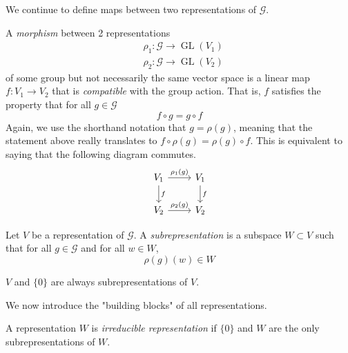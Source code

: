 \documentclass{article}
\DeclareMathOperator{\GL}{GL}
\begin{document}
  We continue to define maps between two representations of $\mathcal{G}$. 

  \begin{definition}
  A \textit{morphism} between 2 representations 
  \begin{align*}
      & \rho_1: \mathcal{G} \longrightarrow \GL(V_1) \\
      & \rho_2: \mathcal{G} \longrightarrow \GL(V_2) 
  \end{align*}
  of some group but not necessarily the same vector space is a linear map $f: V_1 \longrightarrow V_2$ that is \textit{compatible} with the group action. That is, $f$ satisfies the property that for all $g \in \mathcal{G}$
  \[f \circ g = g \circ f\]
  Again, we use the shorthand notation that $g = \rho(g)$, meaning that the statement above really translates to $ f \circ \rho(g) = \rho(g) \circ f$. This is equivalent to saying that the following diagram commutes. 
  \[\begin{tikzcd}
  V_1 \arrow{r}{\rho_1(g)} \arrow{d}{f} & V_1 \arrow{d}{f} \\
  V_2 \arrow{r}{\rho_2 (g)} & V_2
  \end{tikzcd}\]
  \end{definition}

  \begin{definition}
  Let $V$ be a representation of $\mathcal{G}$. A \textit{subrepresentation} is a subspace $W \subset V$ such that for all $g \in \mathcal{G}$ and for all $w \in W$, 
  \[\rho(g)(w) \in W\]
  \end{definition}

  \begin{example}
  $V$ and $\{0\}$ are always subrepresentations of $V$. 
  \end{example}

  We now introduce the "building blocks" of all representations. 
  \begin{definition}
  A representation $W$ is \textit{irreducible representation} if $\{0\}$ and $W$ are the only subrepresentations of $W$. 
  \end{definition}
\end{document}
